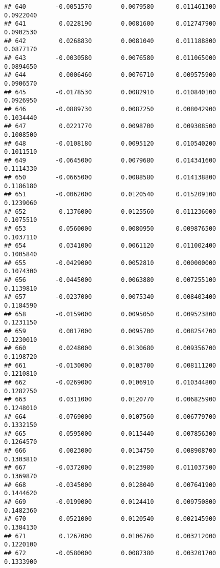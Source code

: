 \documentclass[
]{article}
\begin{document}
\begin{verbatim}
## 640        -0.0051570        0.0079580      0.011461300             0.0922040
## 641         0.0228190        0.0081600      0.012747900             0.0902530
## 642         0.0268830        0.0081040      0.011188800             0.0877170
## 643        -0.0030580        0.0076580      0.011065000             0.0894650
## 644         0.0006460        0.0076710      0.009575900             0.0906570
## 645        -0.0178530        0.0082910      0.010840100             0.0926950
## 646        -0.0889730        0.0087250      0.008042900             0.1034440
## 647         0.0221770        0.0098700      0.009308500             0.1008500
## 648        -0.0108180        0.0095120      0.010540200             0.1011510
## 649        -0.0645000        0.0079680      0.014341600             0.1114330
## 650        -0.0665000        0.0088580      0.014138800             0.1186180
## 651        -0.0062000        0.0120540      0.015209100             0.1239060
## 652         0.1376000        0.0125560      0.011236000             0.1075510
## 653         0.0560000        0.0080950      0.009876500             0.1037110
## 654         0.0341000        0.0061120      0.011002400             0.1005840
## 655        -0.0429000        0.0052810      0.000000000             0.1074300
## 656        -0.0445000        0.0063880      0.007255100             0.1139810
## 657        -0.0237000        0.0075340      0.008403400             0.1184590
## 658        -0.0159000        0.0095050      0.009523800             0.1231150
## 659         0.0017000        0.0095700      0.008254700             0.1230010
## 660         0.0248000        0.0130680      0.009356700             0.1198720
## 661        -0.0130000        0.0103700      0.008111200             0.1210810
## 662        -0.0269000        0.0106910      0.010344800             0.1282750
## 663         0.0311000        0.0120770      0.006825900             0.1248010
## 664        -0.0769000        0.0107560      0.006779700             0.1332150
## 665         0.0595000        0.0115440      0.007856300             0.1264570
## 666         0.0023000        0.0134750      0.008908700             0.1303810
## 667        -0.0372000        0.0123980      0.011037500             0.1369870
## 668        -0.0345000        0.0128040      0.007641900             0.1444620
## 669        -0.0199000        0.0124410      0.009750800             0.1482360
## 670         0.0521000        0.0120540      0.002145900             0.1384130
## 671         0.1267000        0.0106760      0.003212000             0.1220100
## 672        -0.0580000        0.0087380      0.003201700             0.1333900

\end{verbatim}
\end{document}
